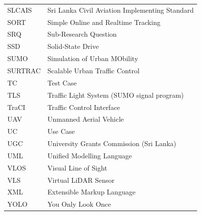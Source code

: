 \begin{longtable}{@{}p{}p{}@{}}
SLCAIS & Sri Lanka Civil Aviation Implementing Standard\\
SORT & Simple Online and Realtime Tracking\\
SRQ & Sub-Research Question\\
SSD & Solid-State Drive\\
SUMO & Simulation of Urban MObility\\
SURTRAC & Scalable Urban Traffic Control\\
TC & Test Case\\
TLS & Traffic Light System (SUMO signal program)\\
TraCI & Traffic Control Interface\\
UAV & Unmanned Aerial Vehicle\\
UC & Use Case\\
UGC & University Grants Commission (Sri Lanka)\\
UML & Unified Modelling Language\\
VLOS & Visual Line of Sight\\
VLS & Virtual LiDAR Sensor\\
XML & Extensible Markup Language\\
YOLO & You Only Look Once\\
\end{longtable}
\renewcommand{\arraystretch}{1.0}
